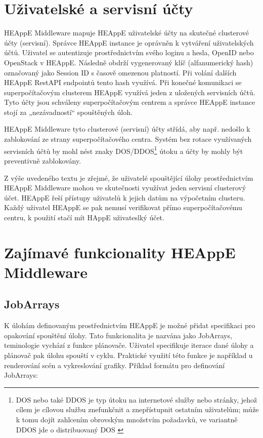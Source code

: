 \section{Uživatelské a servisní účty}
HEAppE Middleware mapuje HEAppE uživatelské účty na skutečné clusterové účty (servisní). Správce HEAppE instance je oprávněn k vytváření uživatelských účtů. Uživatel se autentizuje prostřednictvím svého loginu a hesla, OpenID nebo OpenStack v HEAppE. Následně obdrží vygenerovaný klíč (alfanumerický hash) označovaný jako Session ID s časově omezenou platností. Při volání dalších HEAppE RestAPI endpointů tento hash využívá. Při konečné komunikaci se superpočítačovým clusterem HEAppE využívá jeden z uložených servisních účtů. Tyto účty jsou schváleny superpočítačovým centrem a správce HEAppE instance stojí za „nezávadností“ spouštěných úloh. 

HEAppE Middleware tyto clusterové (servisní) účty střídá, aby např. nedošlo k zablokování ze strany superpočítačového centra. Systém bez rotace využívaných servisních účtů by mohl nést znaky DOS/DDOS\footnote{DOS nebo také DDOS je typ útoku na internetové služby nebo stránky, jehož cílem je cílovou službu znefunkčnit a znepřístupnit ostatním uživatelům; může k tomu dojít zahlcením obrovským množstvím požadavků, ve variantně DDOS jde o distribuovaný DOS \cite{UUBpn6UTaV8mOipc}} útoku a účty by mohly být preventivně zablokovány.

Z výše uvedeného textu je zřejmé, že uživatelé spouštějící úlohy prostřednictvím HEAppE Middleware mohou ve skutečnosti využívat jeden servisní clusterový účet. HEAppE řeší přístupy uživatelů k jejich datům na výpočetním clusteru. Každý uživatel HEAppE se pak nemusí verifikovat přímo superpočítačovému centru, k použití stačí mít HAppE uživateslký účet.

\section{Zajímavé funkcionality HEAppE Middleware}
\subsection{JobArrays}
K úlohám definovaným prostřednictvím HEAppE je možné přidat specifikaci pro opakování spouštění úlohy. Tato funkcionalita je nazvána jako JobArrays, teminologie vychází z funkce plánovače. Uživatel specifikuje iterace dané úlohy a plánovač pak úlohu spouští v cyklu. Praktické využití této funkce je například u renderování scén a vykreslování grafiky.
Příklad formátu pro definování JobArrays:


